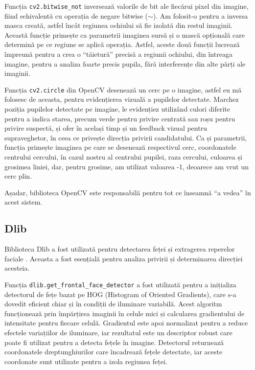 \documentclass[12pt,a4paper]{article}
\begin{document}
Funcția \texttt{cv2.bitwise\_not} inversează valorile de bit ale fiecărui pixel
din imagine, fiind echivalentă cu operația de negare bitwise ($\sim$). Am
folosit-o pentru a inversa masca creată, astfel încât regiunea ochiului
să fie izolată din restul imaginii. Această funcție primește ca
parametrii imaginea sursă și o mască opțională care determină pe ce
regiune se aplică operația. Astfel, aceste două funcții lucrează
împreună pentru a crea o ``tăietură'' precisă a regiunii ochiului, din
întreaga imagine, pentru a analiza foarte precis pupila, fără
interferențe din alte părți ale imaginii.

Funcția \texttt{cv2.circle} din OpenCV desenează un cerc pe o imagine, astfel eu
mă folosesc de aceasta, pentru evidențierea vizuală a pupilelor
detectate. Marchez poziția pupilelor detectate pe imagine, le evidențiez
utilizând culori diferite pentru a indica starea, precum verde pentru
privire centrată sau roșu pentru privire suspectă, și ofer în același
timp și un feedback vizual pentru supraveghetor, în ceea ce privește
direcția privirii candidatului. Ca și parametrii, funcția primește
imaginea pe care se desenează respectivul cerc, coordonatele centrului
cercului, în cazul nostru al centrului pupilei, raza cercului, culoarea
și grosimea liniei, dar, pentru grosime, am utilizat valoarea -1,
deoarece am vrut un cerc plin.

Așadar, biblioteca OpenCV este responsabilă pentru tot ce înseamnă ``a
vedea'' în acest sistem.

\subsection{Dlib}
Biblioteca Dlib a fost utilizată pentru detectarea feței și extragerea reperelor faciale \cite{dlib}. Aceasta a fost esențială pentru analiza privirii și determinarea direcției acesteia. 

Funcția \texttt{dlib.get\_frontal\_face\_detector} a fost utilizată pentru a inițializa detectorul de fețe bazat pe HOG (Histogram of Oriented Gradients), care s-a dovedit eficient chiar și în condiții de iluminare variabilă. Acest algoritm funcționează prin împărțirea imaginii în celule mici și calcularea gradientului de intensitate pentru fiecare celulă. Gradientul este apoi normalizat pentru a reduce efectele variațiilor de iluminare, iar rezultatul este un descriptor robust care poate fi utilizat pentru a detecta fețele în imagine. Detectorul returnează coordonatele dreptunghiurilor care încadrează fețele detectate, iar aceste coordonate sunt utilizate pentru a izola regiunea feței.
\end{document}
